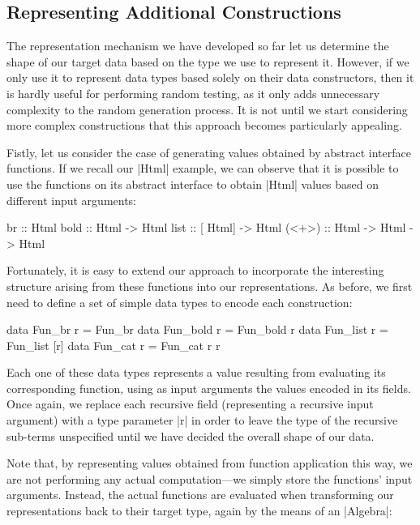 %
\subsection{Representing Additional Constructions}

The representation mechanism we have developed so far let us determine the shape
of our target data based on the type we use to represent it.
%
However, if we only use it to represent data types based solely on their data
constructors, then it is hardly useful for performing random testing, as it only
adds unnecessary complexity to the random generation process.
%
It is not until we start considering more complex constructions that this
approach becomes particularly appealing.

%
%
Fistly, let us consider the case of generating values obtained by abstract
interface functions.
%
If we recall our |Html| example, we can observe that it is possible to use the
functions on its abstract interface to obtain |Html| values based on different
input arguments:

\begin{code}
br     ::                        Html
bold   ::     Html   ->          Html
list   ::  [  Html]  ->          Html
(<+>)  ::     Html   -> Html ->  Html
\end{code}

Fortunately, it is easy to extend our approach to incorporate the interesting
structure arising from these functions into our representations.
%
As before, we first need to define a set of simple data types to encode each
construction:

\begin{code}
data Fun_br     r = Fun_br
data Fun_bold   r = Fun_bold r
data Fun_list   r = Fun_list [r]
data Fun_cat    r = Fun_cat  r r
\end{code}
%
Each one of these data types represents a value resulting from evaluating its
corresponding function, using as input arguments the values encoded in its
fields.
%
Once again, we replace each recursive field (representing a recursive input
argument) with a type parameter |r| in order to leave the type of the recursive
sub-terms unspecified until we have decided the overall shape of our data.


Note that, by representing values obtained from function application this way,
we are not performing any actual computation---we simply store the functions'
input arguments.
%
Instead, the actual functions are evaluated when transforming our
representations back to their target type, again by the means of an |Algebra|:


